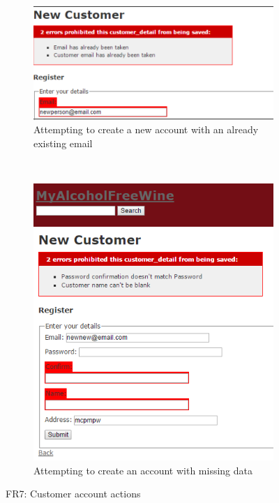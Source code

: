 \documentclass[12pt]{article}
\begin{document}
\begin{figure}[H]
    \centering
    \begin{subfigure}[b]{0.5\textwidth}
        \includegraphics[width=\textwidth]{assets/FR7_screen_7}
        \caption{Attempting to create a new account with an already existing email}
        \label{fig:FR7 Duplicate}
    \end{subfigure}
    ~ %
    \begin{subfigure}[b]{0.5\textwidth}
        \includegraphics[width=\textwidth]{assets/FR7_screen_8}
        \caption{Attempting to create an account with missing data}
        \label{fig:FR7 Missing data}
    \end{subfigure}
    \caption{FR7: Customer account actions}\label{fig:FR7 Customer Account 3}
\end{figure}
\end{document}
